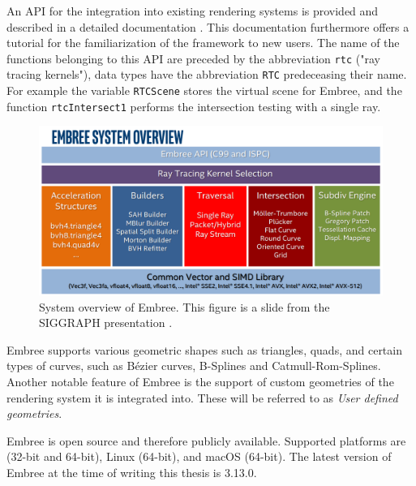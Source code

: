 An API for the integration into existing rendering systems is provided and described in a detailed documentation \cite{embree2021Doc}. This documentation furthermore offers a tutorial for the familiarization of the framework to new users. The name of the functions belonging to this API are preceded by the abbreviation \texttt{rtc} ("ray tracing kernels"), data types have the abbreviation \texttt{RTC} predeceasing their name. For example the variable \texttt{RTCScene} stores the virtual scene for Embree, and the function \texttt{rtcIntersect1} performs the intersection testing with a single ray.

\begin{figure}
	\centering
	\includegraphics[width=1\linewidth]{img/1 fundamentals/embree_overview.png}
	\caption{System overview of Embree. This figure is a slide from the SIGGRAPH presentation  \cite{embreeSlides}.}
	\label{fig:embree}
\end{figure}

Embree supports various geometric shapes such as triangles, quads, and certain types of curves, such as Bézier curves, B-Splines and Catmull-Rom-Splines.
Another notable feature of Embree is the support of custom geometries of the rendering system it is integrated into. These will be referred to as \emph{User defined geometries}.

Embree is open source and therefore publicly available. Supported platforms are (32-bit and 64-bit), Linux (64-bit), and macOS (64-bit). The latest version of Embree at the time of writing this thesis is 3.13.0. 